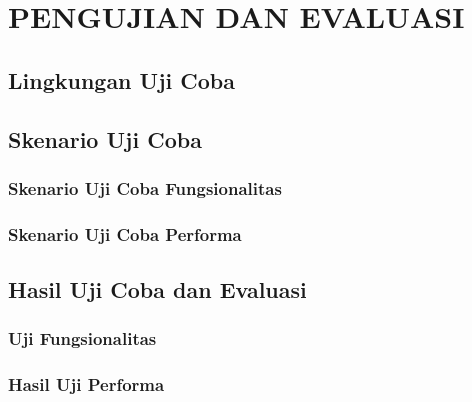 \chapter{PENGUJIAN DAN EVALUASI}


\section{Lingkungan Uji Coba}

   
\section{Skenario Uji Coba} \label{skenarioujicoba}
	
    
    
    \subsection{Skenario Uji Coba Fungsionalitas}
    	     
    \subsection{Skenario Uji Coba Performa}
    	
    
\section{Hasil Uji Coba dan Evaluasi}
	
	\subsection{Uji Fungsionalitas}
    
   	
    \subsection{Hasil Uji Performa}
    	